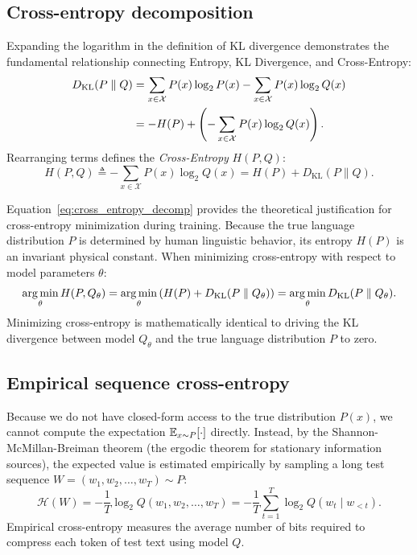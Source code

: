 \documentclass[../../main.tex]{subfiles}
\begin{document}
\subsection{Cross-entropy decomposition}
Expanding the logarithm in the definition of KL divergence demonstrates the fundamental relationship connecting Entropy, KL Divergence, and Cross-Entropy:
\begin{align}
D_{\text{KL}}(P \parallel Q) &= \sum_{x \in \mathcal{X}} P(x) \log_2 P(x) - \sum_{x \in \mathcal{X}} P(x) \log_2 Q(x) \notag \\
&= - H(P) + \left( - \sum_{x \in \mathcal{X}} P(x) \log_2 Q(x) \right). \label{eq:kl_expanded}
\end{align}
Rearranging terms defines the \emph{Cross-Entropy} $H(P, Q)$:
\begin{equation}
\label{eq:cross_entropy_decomp}
H(P, Q) \triangleq - \sum_{x \in \mathcal{X}} P(x) \log_2 Q(x) = H(P) + D_{\text{KL}}(P \parallel Q).
\end{equation}

Equation~\eqref{eq:cross_entropy_decomp} provides the theoretical justification for cross-entropy minimization during training. Because the true language distribution $P$ is determined by human linguistic behavior, its entropy $H(P)$ is an invariant physical constant. When minimizing cross-entropy with respect to model parameters $\theta$:
\begin{equation}
\label{eq:mle_equivalence}
\operatorname*{\mathrm{arg\,min}}_\theta H(P, Q_\theta) = \operatorname*{\mathrm{arg\,min}}_\theta \left( H(P) + D_{\text{KL}}(P \parallel Q_\theta) \right) = \operatorname*{\mathrm{arg\,min}}_\theta D_{\text{KL}}(P \parallel Q_\theta).
\end{equation}
Minimizing cross-entropy is mathematically identical to driving the KL divergence between model $Q_\theta$ and the true language distribution $P$ to zero.

\subsection{Empirical sequence cross-entropy}
Because we do not have closed-form access to the true distribution $P(x)$, we cannot compute the expectation $\operatorname*{\mathbb{E}}_{x \sim P}[\cdot]$ directly. Instead, by the Shannon-McMillan-Breiman theorem (the ergodic theorem for stationary information sources), the expected value is estimated empirically by sampling a long test sequence $W = (w_1, w_2, \dots, w_T) \sim P$:
\begin{equation}
\label{eq:empirical_cross_entropy}
\mathcal{H}(W) = - \frac{1}{T} \log_2 Q(w_1, w_2, \dots, w_T) = - \frac{1}{T} \sum_{t=1}^T \log_2 Q(w_t \mid w_{<t}).
\end{equation}
Empirical cross-entropy measures the average number of bits required to compress each token of test text using model $Q$.
\end{document}
